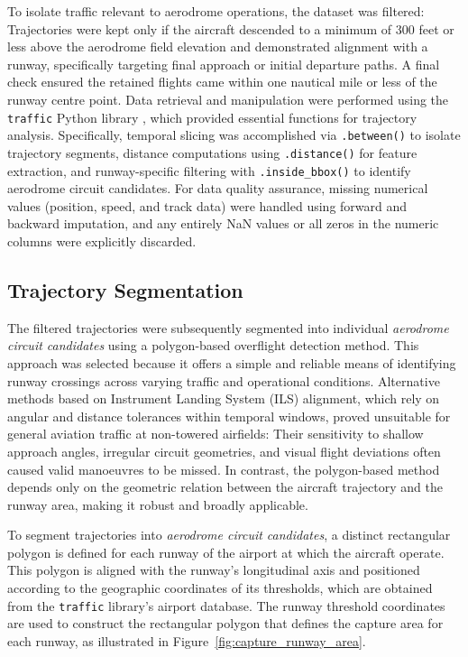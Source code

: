 \documentclass[
  manuscript=proceedings,  %
  layout=preprint,         %
  year=2025,
  volume=x,
]{extra/joas}
\begin{document}
To isolate traffic relevant to aerodrome operations, the dataset was filtered: Trajectories were kept only if the aircraft descended to a minimum of 300 feet or less above the aerodrome field elevation and demonstrated alignment with a runway, specifically targeting final approach or initial departure paths. A final check ensured the retained flights came within one nautical mile or less of the runway centre point. Data retrieval and manipulation were performed using the \texttt{traffic} Python library \cite{olive2019traffic}, which provided essential functions for trajectory analysis.  Specifically, temporal slicing was accomplished via \texttt{.between()} to isolate trajectory segments, distance computations using \texttt{.distance()} for feature extraction, and runway-specific filtering with \texttt{.inside\_bbox()} to identify aerodrome circuit candidates. For data quality assurance, missing numerical values (position, speed, and track data) were handled using forward and backward imputation, and any entirely NaN values or all zeros in the numeric columns were explicitly discarded.

\subsection{Trajectory Segmentation}
\label{sec:segmentation}
The filtered trajectories were subsequently segmented into individual \textit{aerodrome circuit candidates} using a polygon-based overflight detection method. This approach was selected because it offers a simple and reliable means of identifying runway crossings across varying traffic and operational conditions. Alternative methods based on Instrument Landing System (ILS) alignment, which rely on angular and distance tolerances within temporal windows, proved unsuitable for general aviation traffic at non-towered airfields: Their sensitivity to shallow approach angles, irregular circuit geometries, and visual flight deviations often caused valid manoeuvres to be missed. In contrast, the polygon-based method depends only on the geometric relation between the aircraft trajectory and the runway area, making it robust and broadly applicable.

To segment trajectories into \textit{aerodrome circuit candidates}, a distinct rectangular polygon is defined for each runway of the airport at which the aircraft operate. This polygon is aligned with the runway's longitudinal axis and positioned according to the geographic coordinates of its thresholds, which are obtained from the \texttt{traffic} library's airport database. The runway threshold coordinates are used to construct the rectangular polygon that defines the capture area for each runway, as illustrated in Figure~\ref{fig:capture_runway_area}. 
\end{document}
